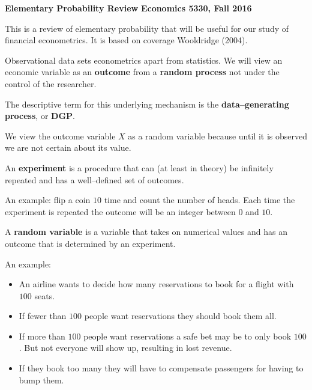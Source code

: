 \documentclass[11pt]{article}
\begin{document}
\pagestyle{empty}

\textbf{Elementary Probability Review}
\textbf{Economics 5330, Fall 2016}
\vspace{3.5mm}


This is a review of elementary probability that will be useful for our study of financial econometrics. It is based on coverage Wooldridge (2004).

\vspace{3.5mm}

Observational data sets econometrics apart from statistics.  We will view an economic variable as an \textbf{outcome}
from a \textbf{random process} not under the control of the researcher.

\vspace{2mm}

The descriptive term for this underlying mechanism is the \textbf{data--generating process}, or \textbf{DGP}.

\vspace{2mm}

We view the outcome variable $X$ as a random variable because until it is observed we are not certain about its value.

\vspace{2mm}

An \textbf{experiment} is a procedure that can (at least in theory) be infinitely repeated and has a well--defined set 
of outcomes.

\vspace{2mm}
An example: flip a coin $10$ time and count the number of heads. Each time the experiment is repeated the outcome will 
be an integer between $0$ and $10$.

\vspace{2mm}

A \textbf{random variable} is a variable that takes on numerical values and has an outcome that is determined by an experiment.
\vspace{2mm}

An example: 

\begin{itemize}
 \item An airline wants to decide how many reservations to book for a flight with $100$ seats.
 \item If fewer than $100$ people want reservations they should book them all.
 \item If more than $100$ people want reservations a safe bet may be to only book $100$. But not everyone will show up, resulting
       in lost revenue.
 \item If they book too many they will have to compensate passengers for having to bump them.
\end{itemize}
\end{document}
